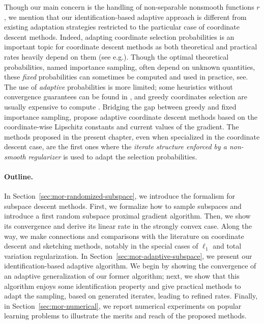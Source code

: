 Though our main concern is the handling of non-separable nonsmooth functions $r$, we mention that our identification-based adaptive approach is different from existing adaptation strategies restricted to the particular case of coordinate descent methods. Indeed, adapting coordinate selection probabilities is an important topic for coordinate descent methods as both theoretical and practical rates heavily depend on them (see e.g.\;\cite{richtarik2014iteration,necoara2014random}).
Though the optimal theoretical probabilities, named importance sampling, often depend on unknown quantities, these \emph{fixed} probabilities can sometimes be computed and used in practice, see\;\cite{zhao2015stochastic,richtarik2016optimal}.
The use of \emph{adaptive} probabilities is more limited; some heuristics without convergence guarantees can be found in \cite{loshchilov2011adaptive,glasmachers2013accelerated}, and greedy coordinates selection
are usually expensive to compute \cite{dhillon2011nearest,nutini2015coordinate,nutini2017let}. Bridging the gap between greedy and fixed importance sampling, \cite{perekrestenko2017faster,namkoong2017adaptive,stich2017safe} propose adaptive coordinate descent methods based on the coordinate-wise Lipschitz constants and current values of the gradient. 
The methods proposed in the present chapter, even when specialized in the coordinate descent case, are the first ones where the \emph{iterate structure enforced by a non-smooth regularizer} is used to adapt the selection probabilities.

{\paragraph{Outline.} In Section~\ref{sec:mor-randomized-subspace}, we introduce the formalism for subspace descent methods. First, we formalize how to sample subspaces and introduce a first random subspace proximal gradient algorithm. Then, we show its convergence and derive its linear rate in the strongly convex case. Along the way, we make connections and comparisons with the literature on coordinate descent and sketching methods, notably in the special cases of $\ell_1$ and total variation regularization. In Section~\ref{sec:mor-adaptive-subspace}, we present our identification-based adaptive algorithm. We begin by showing the convergence of an adaptive generalization of our former algorithm; next, we show that this algorithm enjoys some identification property and give practical methods to adapt the sampling, based on generated iterates, leading to refined rates. Finally, in Section~\ref{sec:mor-numerical}, we report numerical experiments on popular learning problems to illustrate the merits and reach of the proposed methods.
}

